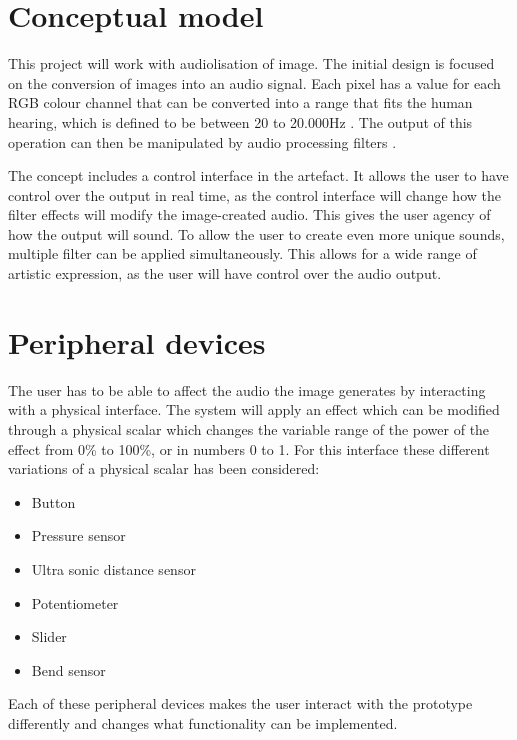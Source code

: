 \section{Conceptual model}
This project will work with audiolisation of image. The initial design is focused on the conversion of images into an audio signal. Each pixel has a value for each RGB colour channel that can be converted into a range that fits the human hearing, which is defined to be between 20 to 20.000Hz . The output of this operation can then be manipulated by audio processing filters .

The concept includes a control interface in the artefact. It allows the user to have control over the output in real time, as the control interface will change how the filter effects will modify the image-created audio. This gives the user agency of how the output will sound. To allow the user to create even more unique sounds, multiple filter can be applied simultaneously. This allows for a wide range of artistic expression, as the user will have control over the audio output.

\section{Peripheral devices}
The user has to be able to affect the audio the image generates by interacting with a physical interface. The system will apply an effect which can be modified through a physical scalar which changes the variable range of the power of the effect from 0\% to 100\%, or in numbers 0 to 1. For this interface these different variations of a physical scalar has been considered: 

\begin{itemize}
\item Button
\item Pressure sensor
\item Ultra sonic distance sensor
\item Potentiometer
\item Slider
\item Bend sensor
\end{itemize}

Each of these peripheral devices makes the user interact with the prototype differently and changes what functionality can be implemented.

